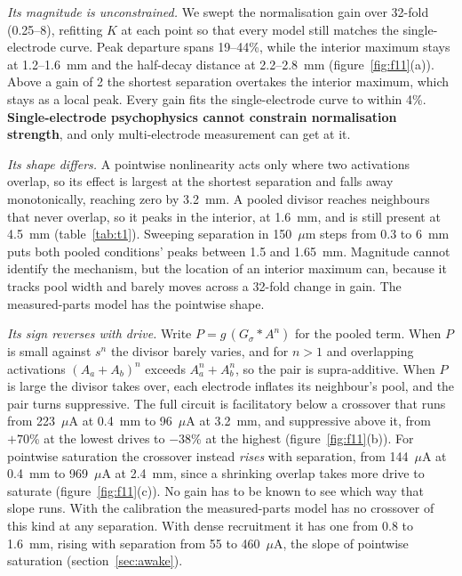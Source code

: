 \documentclass[10pt,twocolumn]{article}
\newcommand{\um}{\ensuremath{\mu\text{m}}}
\newcommand{\uA}{\ensuremath{\mu\text{A}}}
\begin{document}
\textit{Its magnitude is unconstrained.} We swept the normalisation gain
over 32-fold (0.25--8), refitting $K$ at each point so that every model
still matches the single-electrode curve. Peak departure spans 19--44\%,
while the interior maximum stays at 1.2--1.6~mm and the
half-decay distance at 2.2--2.8~mm (figure~\ref{fig:f11}(a)). Above a
gain of 2 the shortest separation overtakes the interior maximum, which
stays as a local peak. Every gain fits the single-electrode curve to
within 4\%.
\textbf{Single-electrode psychophysics cannot constrain normalisation
strength}, and only multi-electrode measurement can get at it.

\textit{Its shape differs.} A pointwise nonlinearity acts only where two
activations overlap, so its effect is largest at the shortest separation
and falls away monotonically, reaching zero by 3.2~mm. A pooled divisor
reaches neighbours that never overlap, so it peaks in the interior, at
1.6~mm, and is still present at 4.5~mm (table~\ref{tab:t1}). Sweeping
separation in 150~\um{} steps from 0.3 to 6~mm puts both pooled
conditions' peaks between 1.5 and 1.65~mm. Magnitude cannot identify the
mechanism, but the location of an interior maximum can, because it tracks
pool width and barely moves across a 32-fold change in gain. The
measured-parts model has the pointwise shape.

\textit{Its sign reverses with drive.} Write $P = g\,(G_\sigma * A^n)$ for
the pooled term. When $P$ is small against $s^n$ the divisor barely
varies, and for $n>1$ and overlapping activations $(A_a+A_b)^n$ exceeds
$A_a^n + A_b^n$, so the pair is supra-additive. When $P$ is large the
divisor takes over, each electrode inflates its neighbour's pool, and the
pair turns suppressive. The full circuit is facilitatory below a crossover
that runs from 223~\uA{} at 0.4~mm to 96~\uA{} at 3.2~mm, and suppressive
above it, from $+70$\% at the lowest drives to $-38$\% at the highest
(figure~\ref{fig:f11}(b)). For pointwise saturation the crossover instead
\emph{rises} with separation, from 144~\uA{} at 0.4~mm to 969~\uA{} at
2.4~mm, since a shrinking overlap takes more drive to saturate
(figure~\ref{fig:f11}(c)). No gain has to be known to see which way that
slope runs. With the calibration the measured-parts model has no
crossover of this kind at any separation. With dense recruitment it has one
from 0.8 to 1.6~mm, rising with separation from 55 to 460~\uA, the slope of
pointwise saturation (section~\ref{sec:awake}).
\end{document}
